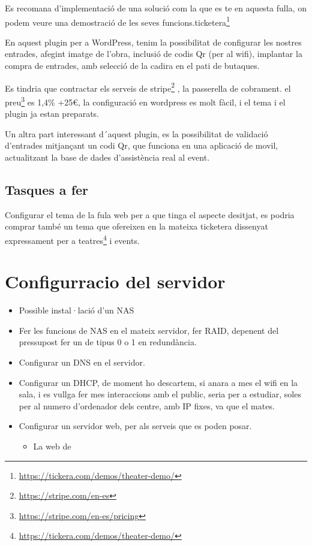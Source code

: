\documentclass[
  10pt,
]{krantz}
\DeclareRobustCommand{\href}[2]{#2\footnote{\url{#1}}}
\providecommand{\tightlist}{%
  \setlength{\itemsep}{0pt}\setlength{\parskip}{0pt}}
\begin{document}
Es recomana d'implementació de una solució com la que es te en aquesta fulla, on podem veure una demostració de les seves funcions.\href{https://tickera.com/demos/theater-demo/}{ticketera}

En aquest plugin per a WordPress, tenim la possibilitat de configurar les nostres entrades, afegint imatge de l'obra, inclusió de codis Qr (per al wifi), implantar la compra de entrades, amb selecció de la cadira en el pati de butaques.

Es tindria que contractar els serveis de \href{https://stripe.com/en-es}{stripe} , la passerella de cobrament. el \href{https://stripe.com/en-es/pricing}{preu} es 1,4\% +25€, la configuració en wordpress es molt fàcil, i el tema i el plugin ja estan preparats.

Un altra part interessant d´aquest plugin, es la possibilitat de validació d'entrades mitjançant un codi Qr, que funciona en una aplicació de movil, actualitzant la base de dades d'assistència real al event.

\hypertarget{tasques-a-fer}{%
\section{Tasques a fer}\label{tasques-a-fer}}

Configurar el tema de la fula web per a que tinga el aspecte desitjat, es podria comprar també un tema que ofereixen en la mateixa ticketera dissenyat expressament per a \href{https://tickera.com/demos/theater-demo/}{teatres} i events.

\hypertarget{configurracio-del-servidor}{%
\chapter{Configurracio del servidor}\label{configurracio-del-servidor}}

\begin{itemize}
\item
  Possible instal·lació d'un NAS
\item
  Fer les funcions de NAS en el mateix servidor, fer RAID, depenent del pressupost fer un de tipus 0 o 1 en redundància.
\item
  Configurar un DNS en el servidor.
\item
  Configurar un DHCP, de moment ho descartem, si anara a mes el wifi en la sala, i es vullga fer mes interaccions amb el public, seria per a estudiar, soles per al numero d'ordenador dels centre, amb IP fixes, va que el mates.
\item
  Configurar un servidor web, per als serveis que es poden posar.

  \begin{itemize}
  \tightlist
  \item
    La web de
  \end{itemize}
\end{itemize}
\end{document}
